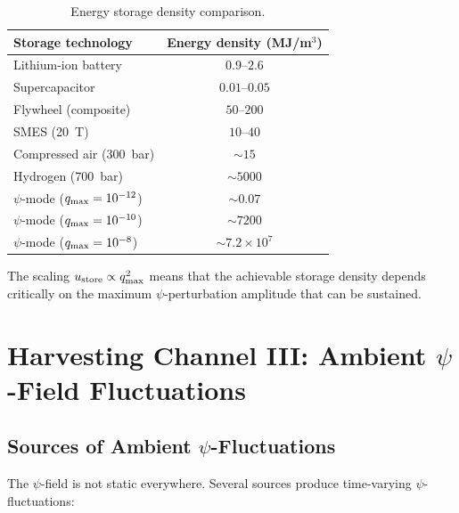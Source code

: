 \documentclass[aps,prd,twocolumn,showpacs,preprintnumbers,superscriptaddress,nofootinbib]{revtex4-2}
\begin{document}
\begin{table}[h]
\caption{Energy storage density comparison.}
\label{tab:storage-compare}
\begin{ruledtabular}
\begin{tabular}{lc}
Storage technology & Energy density (MJ/m$^3$) \\
\hline
Lithium-ion battery & $0.9$--$2.6$ \\
Supercapacitor & $0.01$--$0.05$ \\
Flywheel (composite) & $50$--$200$ \\
SMES (20~T) & $10$--$40$ \\
Compressed air (300~bar) & $\sim 15$ \\
Hydrogen (700~bar) & $\sim 5000$ \\
$\psi$-mode ($q_{\rm max}=10^{-12}$) & $\sim 0.07$ \\
$\psi$-mode ($q_{\rm max}=10^{-10}$) & $\sim 7200$ \\
$\psi$-mode ($q_{\rm max}=10^{-8}$) & $\sim 7.2\times 10^{7}$ \\
\end{tabular}
\end{ruledtabular}
\end{table}

The scaling $u_{\rm store} \propto q_{\rm max}^2$ means that the achievable
storage density depends critically on the maximum $\psi$-perturbation
amplitude that can be sustained.

\section{Harvesting Channel III: Ambient $\psi$-Field Fluctuations}\label{sec:ambient}

\subsection{Sources of Ambient $\psi$-Fluctuations}\label{sec:ambient-sources}

The $\psi$-field is not static everywhere.  Several sources produce
time-varying $\psi$-fluctuations:
\end{document}
